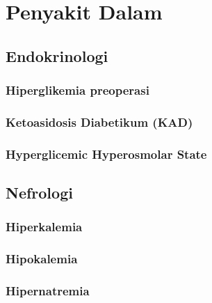 \documentclass[
]{book}
\begin{document}
\hypertarget{penyakit-dalam-1}{%
\section{Penyakit Dalam}\label{penyakit-dalam-1}}

\hypertarget{endokrinologi}{%
\subsection{Endokrinologi}\label{endokrinologi}}

\hypertarget{hiperglikemia-preoperasi}{%
\subsubsection{Hiperglikemia preoperasi}\label{hiperglikemia-preoperasi}}

\hypertarget{ketoasidosis-diabetikum-kad}{%
\subsubsection{Ketoasidosis Diabetikum (KAD)}\label{ketoasidosis-diabetikum-kad}}

\hypertarget{hyperglicemic-hyperosmolar-state}{%
\subsubsection{Hyperglicemic Hyperosmolar State}\label{hyperglicemic-hyperosmolar-state}}

\hypertarget{nefrologi}{%
\subsection{Nefrologi}\label{nefrologi}}

\hypertarget{hiperkalemia}{%
\subsubsection{Hiperkalemia}\label{hiperkalemia}}

\hypertarget{hipokalemia}{%
\subsubsection{Hipokalemia}\label{hipokalemia}}

\hypertarget{hipernatremia}{%
\subsubsection{Hipernatremia}\label{hipernatremia}}
\end{document}
